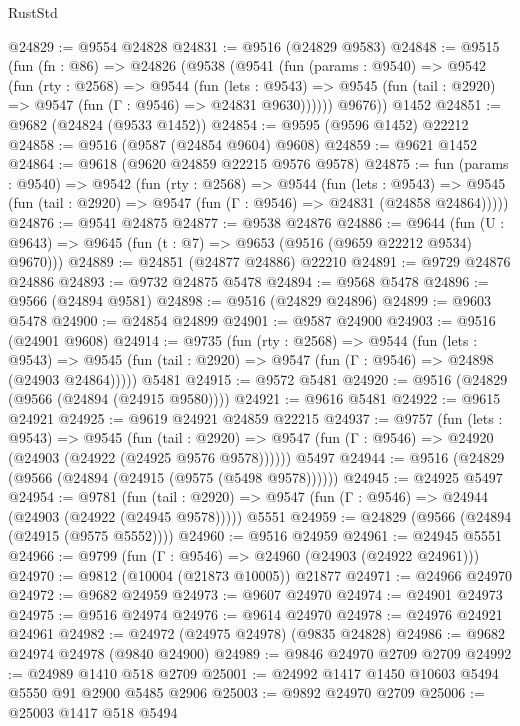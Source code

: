 \begin{lexlean}{RustStd}
\begin{coremodule}
@24829 := @9554 @24828
@24831 := @9516 (@24829 @9583)
@24848 := @9515
    (fun (fn : @86) =>
    @24826
      (@9538
        (@9541
          (fun (params : @9540) =>
          @9542
            (fun (rty : @2568) =>
            @9544
              (fun (lets : @9543) =>
              @9545 (fun (tail : @2920) => @9547 (fun (Γ : @9546) => @24831 @9630))))))
        @9676))
    @1452
@24851 := @9682 (@24824 (@9533 @1452))
@24854 := @9595 (@9596 @1452) @22212
@24858 := @9516 (@9587 (@24854 @9604) @9608)
@24859 := @9621 @1452
@24864 := @9618 (@9620 @24859 @22215 @9576 @9578)
@24875 := fun (params : @9540) =>
  @9542
    (fun (rty : @2568) =>
    @9544
      (fun (lets : @9543) =>
      @9545 (fun (tail : @2920) => @9547 (fun (Γ : @9546) => @24831 (@24858 @24864)))))
@24876 := @9541 @24875
@24877 := @9538 @24876
@24886 := @9644
    (fun (U : @9643) => @9645 (fun (t : @7) => @9653 (@9516 (@9659 @22212 @9534) @9670)))
@24889 := @24851 (@24877 @24886) @22210
@24891 := @9729 @24876 @24886
@24893 := @9732 @24875 @5478
@24894 := @9568 @5478
@24896 := @9566 (@24894 @9581)
@24898 := @9516 (@24829 @24896)
@24899 := @9603 @5478
@24900 := @24854 @24899
@24901 := @9587 @24900
@24903 := @9516 (@24901 @9608)
@24914 := @9735
    (fun (rty : @2568) =>
    @9544
      (fun (lets : @9543) =>
      @9545 (fun (tail : @2920) => @9547 (fun (Γ : @9546) => @24898 (@24903 @24864)))))
    @5481
@24915 := @9572 @5481
@24920 := @9516 (@24829 (@9566 (@24894 (@24915 @9580))))
@24921 := @9616 @5481
@24922 := @9615 @24921
@24925 := @9619 @24921 @24859 @22215
@24937 := @9757
    (fun (lets : @9543) =>
    @9545
      (fun (tail : @2920) =>
      @9547 (fun (Γ : @9546) => @24920 (@24903 (@24922 (@24925 @9576 @9578))))))
    @5497
@24944 := @9516 (@24829 (@9566 (@24894 (@24915 (@9575 (@5498 @9578))))))
@24945 := @24925 @5497
@24954 := @9781
    (fun (tail : @2920) => @9547 (fun (Γ : @9546) => @24944 (@24903 (@24922 (@24945 @9578)))))
    @5551
@24959 := @24829 (@9566 (@24894 (@24915 (@9575 @5552))))
@24960 := @9516 @24959
@24961 := @24945 @5551
@24966 := @9799 (fun (Γ : @9546) => @24960 (@24903 (@24922 @24961)))
@24970 := @9812 (@10004 (@21873 @10005)) @21877
@24971 := @24966 @24970
@24972 := @9682 @24959
@24973 := @9607 @24970
@24974 := @24901 @24973
@24975 := @9516 @24974
@24976 := @9614 @24970
@24978 := @24976 @24921 @24961
@24982 := @24972 (@24975 @24978) (@9835 @24828)
@24986 := @9682 @24974 @24978 (@9840 @24900)
@24989 := @9846 @24970 @2709 @2709
@24992 := @24989 @1410 @518 @2709
@25001 := @24992 @1417 @1450 @10603 @5494 @5550 @91 @2900 @5485 @2906
@25003 := @9892 @24970 @2709
@25006 := @25003 @1417 @518 @5494

\end{coremodule}
\end{lexlean}
